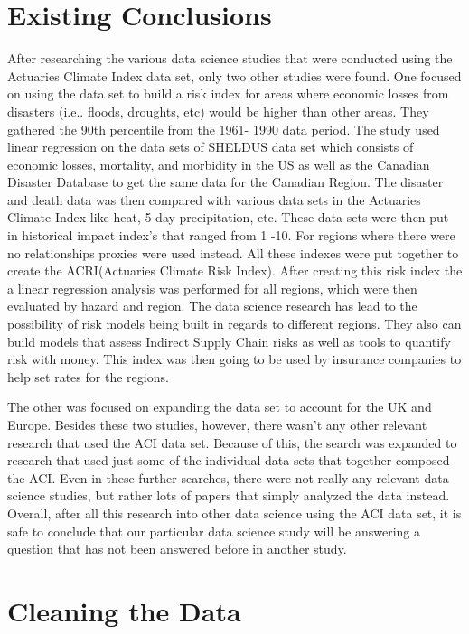 \documentclass[12pt]{report}
\begin{document}
\newpage	
\section* {Existing Conclusions} 
		
\indent	\par After researching the various data science studies that were conducted using the Actuaries Climate Index data set, only two other studies were found. One focused on using the data set to build a risk index for areas where economic losses from disasters (i.e.. floods, droughts, etc) would be higher than other areas. They gathered the 90th percentile from the 1961- 1990 data period. The study used linear regression on the data sets of SHELDUS data set which consists of economic losses, mortality, and morbidity in the US as well as the Canadian Disaster Database to get the same data for the Canadian Region. The disaster and death data was then compared with various data sets in the Actuaries Climate Index like heat, 5-day precipitation, etc. These data sets were then put in historical impact index’s that ranged from 1 -10. For regions where there were no relationships proxies were used instead. All these indexes were put together to create the ACRI(Actuaries Climate Risk Index). After creating this risk index the a linear regression analysis was performed for all regions, which were then evaluated by hazard and region. The data science research has lead to the possibility of risk models being built in regards to different regions. They also can build models that assess Indirect Supply Chain risks as well as tools to quantify risk with money. This index was then going to be used by insurance companies to help set rates for the regions.
\par The other was focused on expanding the data set to account for the UK and Europe. Besides these two studies, however, there wasn't any other relevant research that used the ACI data set. Because of this, the search was expanded to research that used just some of the individual data sets that together composed the ACI. Even in these further searches, there were not really any relevant data science studies, but rather lots of papers that simply analyzed the data instead. Overall, after all this research into other data science using the ACI data set, it is safe to conclude that our particular data science study will be answering a question that has not been answered before in another study.
		
\section* {Cleaning the Data} 
\end{document}
